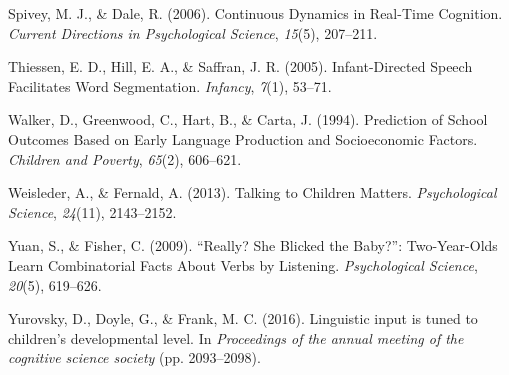 \documentclass[10pt, letterpaper]{article}
\begin{document}
\leavevmode\hypertarget{ref-Spivey:2006fa}{}%
Spivey, M. J., \& Dale, R. (2006). Continuous Dynamics in Real-Time
Cognition. \emph{Current Directions in Psychological Science},
\emph{15}(5), 207--211.

\leavevmode\hypertarget{ref-Thiessen:2005tx}{}%
Thiessen, E. D., Hill, E. A., \& Saffran, J. R. (2005). Infant-Directed
Speech Facilitates Word Segmentation. \emph{Infancy}, \emph{7}(1),
53--71.

\leavevmode\hypertarget{ref-Anonymous:GIFaG1Qd}{}%
Walker, D., Greenwood, C., Hart, B., \& Carta, J. (1994). Prediction of
School Outcomes Based on Early Language Production and Socioeconomic
Factors. \emph{Children and Poverty}, \emph{65}(2), 606--621.

\leavevmode\hypertarget{ref-Weisleder:2013ht}{}%
Weisleder, A., \& Fernald, A. (2013). Talking to Children Matters.
\emph{Psychological Science}, \emph{24}(11), 2143--2152.

\leavevmode\hypertarget{ref-OVIDDS:2009uz}{}%
Yuan, S., \& Fisher, C. (2009). ``Really? She Blicked the Baby?'':
Two-Year-Olds Learn Combinatorial Facts About Verbs by Listening.
\emph{Psychological Science}, \emph{20}(5), 619--626.

\leavevmode\hypertarget{ref-Anonymous:r2JoRscQ}{}%
Yurovsky, D., Doyle, G., \& Frank, M. C. (2016). Linguistic input is
tuned to children's developmental level. In \emph{Proceedings of the
annual meeting of the cognitive science society} (pp. 2093--2098).


\end{document}
